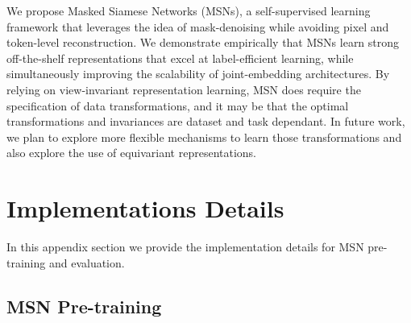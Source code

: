 \documentclass{article}
\begin{document}
We propose Masked Siamese Networks (MSNs), a self-supervised learning framework that leverages the idea of mask-denoising while avoiding pixel and token-level reconstruction. We demonstrate empirically that MSNs learn strong off-the-shelf representations that excel at label-efficient learning, while simultaneously improving the scalability of joint-embedding architectures.
By relying on view-invariant representation learning, MSN does require the specification of data transformations, and it may be that the optimal transformations and invariances are dataset and task dependant.
In future work, we plan to explore more flexible mechanisms to learn those transformations and also explore the use of equivariant representations.





\vfill\pagebreak
\appendix

\section{Implementations Details}
\label{apndx:implementation}

In this appendix section we provide the implementation details for MSN pre-training and evaluation.

\subsection{MSN Pre-training}
\end{document}
